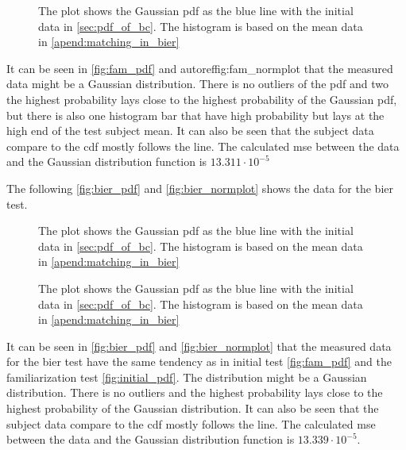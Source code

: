 \begin{figure}[H]
	\centering
	
		\caption{The plot shows the Gaussian  \gls{pdf} as the blue line with the initial data in \autoref{sec:pdf_of_bc}. The histogram is based on the mean data in \autoref{apend:matching_in_bier}}
		\label{fig:fam_normplot}
\end{figure}

It can be seen in \autoref{fig:fam_pdf} and autoref{fig:fam_normplot}  that the measured data might be a Gaussian distribution. There is no outliers of the \gls{pdf} and two the highest probability lays close to the highest probability of the Gaussian \gls{pdf}, but there is also one histogram bar that have high probability but lays at the high end of the test subject mean. It can also be seen that the subject data compare to the \gls{cdf} mostly follows the line. The calculated \gls{mse} between the data and the Gaussian distribution function is $13.311 \cdot 10^{-5}$

The following \autoref{fig:bier_pdf} and \autoref{fig:bier_normplot} shows the data for the \gls{bier} test.
 \begin{figure}[H]
	\centering
	
		\caption{The plot shows the Gaussian  \gls{pdf} as the blue line with the initial data in \autoref{sec:pdf_of_bc}. The histogram is based on the mean data in \autoref{apend:matching_in_bier}}
		\label{fig:bier_pdf}
\end{figure}

 \begin{figure}[H]
	\centering
	
		\caption{The plot shows the Gaussian  \gls{pdf} as the blue line with the initial data in \autoref{sec:pdf_of_bc}. The histogram is based on the mean data in \autoref{apend:matching_in_bier}}
		\label{fig:bier_normplot}
\end{figure}

It can be seen in \autoref{fig:bier_pdf} and \autoref{fig:bier_normplot} that the measured data for the \gls{bier} test have the same tendency as in initial test \autoref{fig:fam_pdf} and the familiarization test \autoref{fig:initial_pdf}. The distribution might be a Gaussian distribution. There is no outliers and the highest probability lays close to the highest probability of the Gaussian distribution.  It can also be seen that the subject data compare to the \gls{cdf} mostly follows the line. The calculated \gls{mse} between the data and the Gaussian distribution function is $13.339 \cdot 10^{-5}$.



